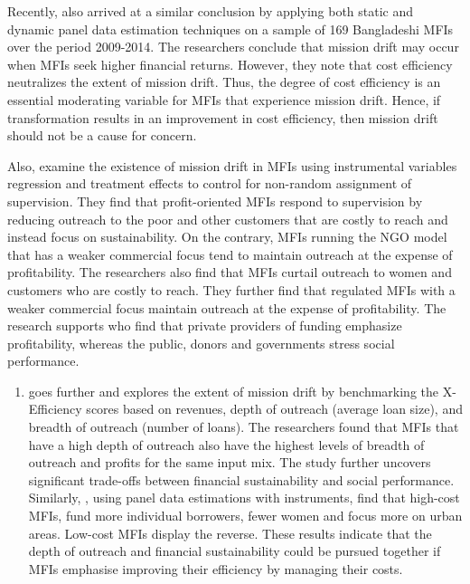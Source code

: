 \documentclass[a4paper, nobind]{templates/ociamthesis}
\providecommand{\tightlist}{%
  \setlength{\itemsep}{0pt}\setlength{\parskip}{0pt}}
\begin{document}
Recently, \textcite{mia2017mission} also arrived at a similar conclusion by applying both static and dynamic panel data estimation techniques on a sample of 169 Bangladeshi MFIs over the period 2009-2014. The researchers conclude that mission drift may occur when MFIs seek higher financial returns. However, they note that cost efficiency neutralizes the extent of mission drift. Thus, the degree of cost efficiency is an essential moderating variable for MFIs that experience mission drift. Hence, if transformation results in an improvement in cost efficiency, then mission drift should not be a cause for concern.

Also, \textcite{cull2011does} examine the existence of mission drift in MFIs using instrumental variables regression and treatment effects to control for non-random assignment of supervision. They find that profit-oriented MFIs respond to supervision by reducing outreach to the poor and other customers that are costly to reach and instead focus on sustainability. On the contrary, MFIs running the NGO model that has a weaker commercial focus tend to maintain outreach at the expense of profitability. The researchers also find that MFIs curtail outreach to women and customers who are costly to reach. They further find that regulated MFIs with a weaker commercial focus maintain outreach at the expense of profitability. The research supports \textcite{cobb2016funding} who find that private providers of funding emphasize profitability, whereas the public, donors and governments stress social performance.

\begin{enumerate}
\def\labelenumi{\arabic{enumi})}
\tightlist
\item
  goes further and explores the extent of mission drift by benchmarking the X-Efficiency scores based on revenues, depth of outreach (average loan size), and breadth of outreach (number of loans). The researchers found that MFIs that have a high depth of outreach also have the highest levels of breadth of outreach and profits for the same input mix. The study further uncovers significant trade-offs between financial sustainability and social performance. Similarly, \textcite{mersland2010microfinance}, using panel data estimations with instruments, find that high-cost MFIs, fund more individual borrowers, fewer women and focus more on urban areas. Low-cost MFIs display the reverse. These results indicate that the depth of outreach and financial sustainability could be pursued together if MFIs emphasise improving their efficiency by managing their costs.
\end{enumerate}
\end{document}
